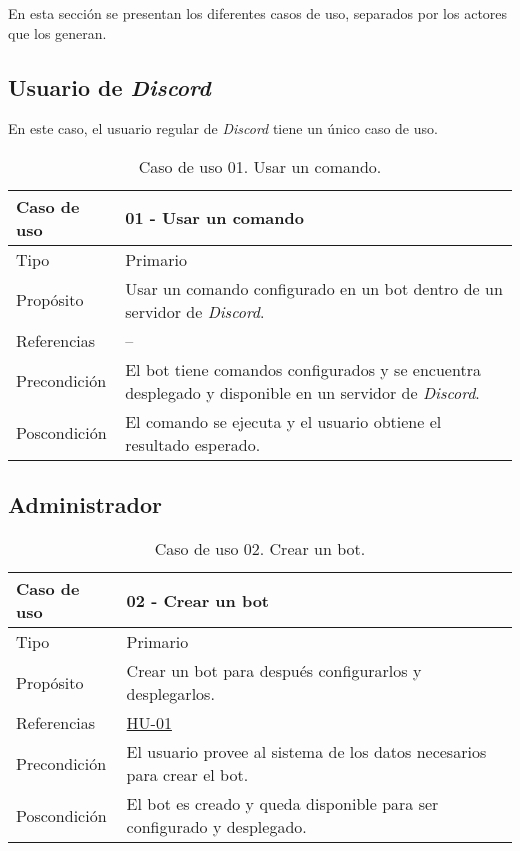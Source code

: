 En esta sección se presentan los diferentes casos de uso, separados por los actores que los generan.

\subsection{Usuario de \textit{Discord}}

En este caso, el usuario regular de \textit{Discord} tiene un único caso de uso.

\begin{table}[H]
    \centering
    \def\arraystretch{1.25}
    \begin{adjustbox}{max width=\textwidth}
    \begin{tabularx}{\textwidth}{|l|L|}
    \hline
        \textbf{Caso de uso} & \textbf{01 - Usar un comando} \\ \hline
    \hline
        Tipo & Primario \\ \hline
        Propósito & Usar un comando configurado en un bot dentro de un servidor de \textit{Discord}. \\ \hline
        Referencias & -- \\ \hline
        Precondición & El bot tiene comandos configurados y se encuentra desplegado y disponible en un servidor de \textit{Discord}. \\ \hline
        Poscondición & El comando se ejecuta y el usuario obtiene el resultado esperado. \\ \hline
    \end{tabularx}
    \end{adjustbox}
    \caption{Caso de uso 01. Usar un comando.}
\end{table}


\subsection{Administrador}

\begin{table}[H]
    \centering
    \def\arraystretch{1.25}
    \begin{adjustbox}{max width=\textwidth}
    \begin{tabularx}{\textwidth}{|l|L|}
    \hline
        \textbf{Caso de uso} & \textbf{02 - Crear un bot} \\ \hline
    \hline
        Tipo & Primario \\ \hline
        Propósito & Crear un bot para después configurarlos y desplegarlos. \\ \hline
        Referencias & \hyperref[sec:hu01]{HU-01} \\ \hline
        Precondición & El usuario provee al sistema de los datos necesarios para crear el bot. \\ \hline
        Poscondición & El bot es creado y queda disponible para ser configurado y desplegado. \\ \hline
    \end{tabularx}
    \end{adjustbox}
    \caption{Caso de uso 02. Crear un bot.}
\end{table}

